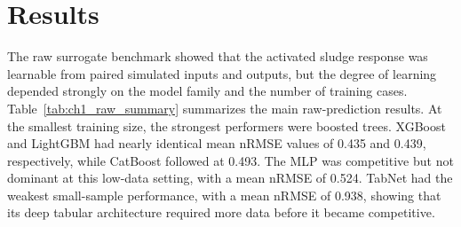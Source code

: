 \documentclass[12pt, twoside]{book}
\begin{document}
\section{Results}

The raw surrogate benchmark showed that the activated sludge response was learnable from paired simulated
inputs and outputs, but the degree of learning depended strongly on the model family and the number of
training cases. Table~\ref{tab:ch1_raw_summary} summarizes the main raw-prediction results. At the smallest
training size, the strongest performers were boosted trees. XGBoost and LightGBM had nearly identical mean
nRMSE values of 0.435 and 0.439, respectively, while CatBoost followed at 0.493. The MLP was competitive but
not dominant at this low-data setting, with a mean nRMSE of 0.524. TabNet had the weakest small-sample
performance, with a mean nRMSE of 0.938, showing that its deep tabular architecture required more data before
it became competitive.
\end{document}
